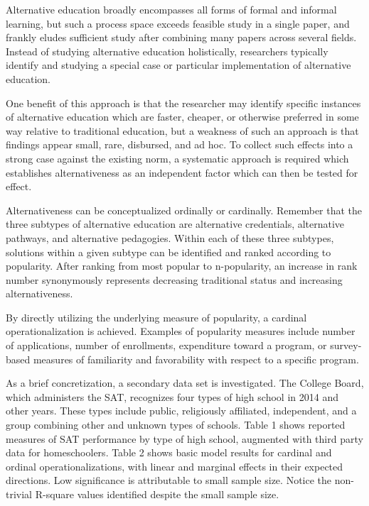 \documentclass[AER]{/Users/zyl357/Documents/GitHub/research-dissertation-case-for-alt-ed/papers/alt-ed-survey/aea-latex-templates/AEA}
\begin{document}
Alternative education broadly encompasses all forms of formal and informal
learning, but such a process space exceeds feasible study in a single
paper, and frankly eludes sufficient study after combining many papers
across several fields. Instead of studying alternative education
holistically, researchers typically identify and studying a special case
or particular implementation of alternative education.

One benefit of this approach is that the researcher may identify specific
instances of alternative education which are faster, cheaper, or otherwise
preferred in some way relative to traditional education, but a weakness of
such an approach is that findings appear small, rare, disbursed, and ad
hoc. To collect such effects into a strong case against the existing norm,
a systematic approach is required which establishes alternativeness as an
independent factor which can then be tested for effect.

Alternativeness can be conceptualized ordinally or cardinally. Remember
that the three subtypes of alternative education are alternative
credentials, alternative pathways, and alternative pedagogies. Within each
of these three subtypes, solutions within a given subtype can be
identified and ranked according to popularity. After ranking from most
popular to n-popularity, an increase in rank number synonymously
represents decreasing traditional status and increasing alternativeness.

By directly utilizing the underlying measure of popularity, a cardinal
operationalization is achieved. Examples of popularity measures include
number of applications, number of enrollments, expenditure toward a
program, or survey-based measures of familiarity and favorability with
respect to a specific program.

As a brief concretization, a secondary data set is investigated. The
College Board, which administers the SAT, recognizes four types of high
school in 2014\cite{collegeboard_2014} and other years. These types include public, religiously
affiliated, independent, and a group combining other and unknown types of
schools. Table 1 shows reported measures of SAT performance by type of
high school, augmented with third party data for homeschoolers\cite{mullins_2016}. Table 2
shows basic model results for cardinal and ordinal operationalizations,
with linear and marginal effects in their expected directions. Low
significance is attributable to small sample size. Notice the non-trivial
R-square values identified despite the small sample size.
\end{document}
